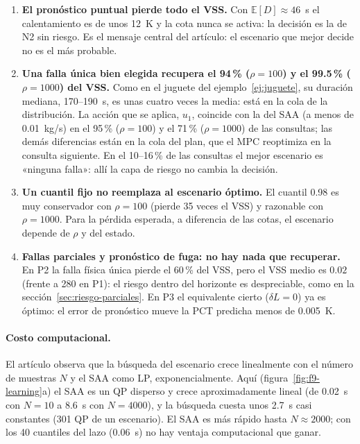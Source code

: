 \begin{enumerate}
  \item \textbf{El pronóstico puntual pierde todo el VSS.} Con $\mathbb E[D]\approx46$~s el
        calentamiento es de unos 12~K y la cota nunca se activa: la decisión es la de N2 sin
        riesgo. Es el mensaje central del artículo: el escenario que mejor decide no es el más
        probable.
  \item \textbf{Una falla única bien elegida recupera el 94\,\% ($\rho=100$) y el 99.5\,\%
        ($\rho=1000$) del VSS.} Como en el juguete del ejemplo~\ref{ej:juguete}, su duración mediana,
170--190~s, es unas cuatro veces la media:
        está en la cola de la distribución. La acción que se aplica, $u_1$, coincide con la del
        SAA (a menos de 0.01~kg/s) en el 95\,\% ($\rho=100$) y el 71\,\% ($\rho=1000$) de las
        consultas; las demás diferencias están en la cola del plan, que el MPC reoptimiza en la
        consulta siguiente. En el 10--16\,\% de las consultas el mejor escenario es «ninguna
        falla»: allí la capa de riesgo no cambia la decisión.
  \item \textbf{Un cuantil fijo no reemplaza al escenario óptimo.} El cuantil 0.98 es muy
        conservador con $\rho=100$ (pierde 35 veces el VSS) y razonable con $\rho=1000$. Para la
        pérdida esperada, a diferencia de las cotas, el escenario depende de $\rho$ y del estado.
  \item \textbf{Fallas parciales y pronóstico de fuga: no hay nada que recuperar.} En P2 la falla
        física única pierde el 60\,\% del VSS, pero el VSS medio es $0.02$ (frente a 280 en P1): el
        riesgo dentro del horizonte es despreciable, como en la sección~\ref{sec:riesgo-parciales}.
        En P3 el equivalente cierto ($\delta L=0$) ya es óptimo: el error de pronóstico mueve la
        PCT predicha menos de 0.005~K.
\end{enumerate}

\paragraph{Costo computacional.} El artículo observa que la búsqueda del escenario crece
linealmente con el número de muestras $N$ y el SAA como LP, exponencialmente. Aquí
(figura~\ref{fig:f9-learning}a) el SAA es un QP disperso y crece aproximadamente lineal (de
0.02~s con $N=10$ a 8.6~s con $N=4000$), y la búsqueda cuesta unos 2.7~s casi constantes (301 QP
de un escenario). El SAA es más rápido hasta $N\approx2000$; con los 40 cuantiles del lazo
(0.06~s) no hay ventaja computacional que ganar.

